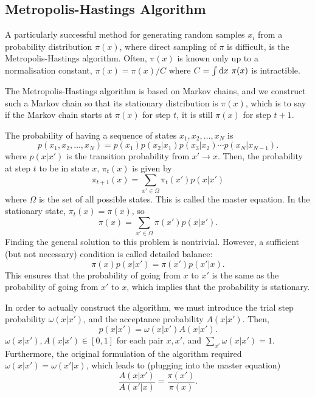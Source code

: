\subsection{Metropolis-Hastings Algorithm}
\label{sec:mcmc}
A particularly successful method for generating random samples $x_i$ from a probability distribution $\pi(x)$, where direct sampling of $\pi$ is difficult, is the Metropolis-Hastings algorithm.\supercite{metropolisEquation1953,hastingsMonte1970} Often, $\pi(x)$ is known only up to a normalisation constant, $\pi(x)=\pi(x)/C$ where $C=\int\mathrm{d} x\ \pi(x)$ is intractible.

The Metropolis-Hastings algorithm is based on Markov chains,\supercite{markovTheory1954} and we construct such a Markov chain so that its stationary distribution is $\pi(x)$, which is to say if the Markov chain starts at $\pi(x)$ for step $t$, it is still $\pi(x)$ for step $t+1$.

The probability of having a sequence of states $x_1,x_2,\ldots,x_N$ is
\begin{equation}
    p(x_1,x_2,\ldots,x_N) = p(x_1)p(x_2|x_1)p(x_3|x_2)\cdots p(x_N|x_{N-1}).
\end{equation}
where $p(x|x')$ is the transition probability from $x'\to x$. Then, the probability at step $t$ to be in state $x$, $\pi_t(x)$ is given by
\begin{equation}
\pi_{t+1}(x) = \sum_{x'\in \Omega} \pi_t(x')p(x|x')
\end{equation}
where $\Omega$ is the set of all possible states. This is called the master equation. In the stationary state, $\pi_t(x)=\pi(x)$, so
\begin{equation}
    \pi(x) = \sum_{x'\in \Omega} \pi(x')p(x|x').
\end{equation}
Finding the general solution to this problem is nontrivial. However, a sufficient (but not necessary) condition is called detailed balance:
\begin{equation}
    \pi(x)p(x|x') = \pi(x')p(x'|x).
\end{equation}
This ensures that the probability of going from $x$ to $x'$ is the same as the probability of going from $x'$ to $x$, which implies that the probability is stationary.

In order to actually construct the algorithm, we must introduce the trial step probability $\omega(x|x')$, and the acceptance probability $A(x|x')$. Then,
\begin{equation}
    p(x|x') = \omega(x|x')A(x|x').
\end{equation}
$\omega(x|x'),A(x|x')\in [0,1]$ for each pair $x,x'$, and $\sum_{x'}\omega(x|x') = 1$. Furthermore, the original formulation of the algorithm required $\omega(x|x') = \omega(x'|x)$, which leads to (plugging into the master equation)
\begin{equation}
    \frac{A(x|x')}{A(x'|x)} = \frac{\pi(x')}{\pi(x)}.
\end{equation}

